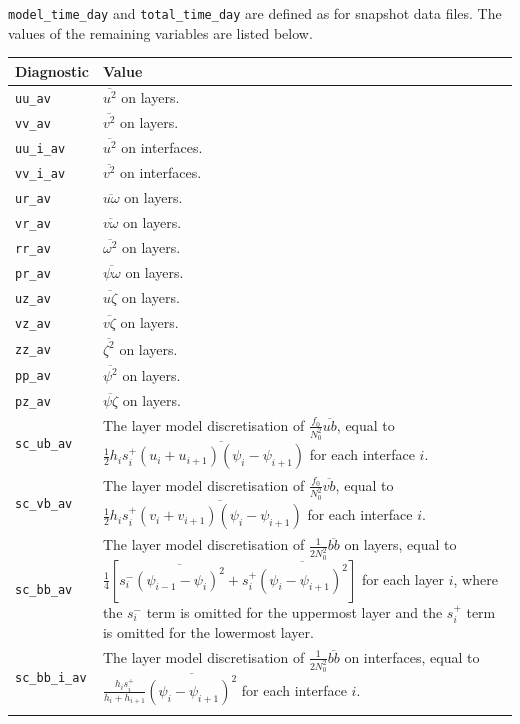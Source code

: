 \documentclass[a4paper]{book}
\begin{document}
\verb+model_time_day+ and \verb+total_time_day+ are defined as for snapshot
data files. The values of the remaining variables are listed below.
\begin{longtable}{ | p{} | p{} | }
  \hline
  Diagnostic & Value \\
  \hline
  \endhead
  \verb+uu_av+      & $\overline{u^2}$ on layers. \\
  \verb+vv_av+      & $\overline{v^2}$ on layers. \\
  \verb+uu_i_av+    & $\overline{u^2}$ on interfaces. \\
  \verb+vv_i_av+    & $\overline{v^2}$ on interfaces. \\
  \verb+ur_av+      & $\overline{u \omega}$ on layers. \\
  \verb+vr_av+      & $\overline{v \omega}$ on layers. \\
  \verb+rr_av+      & $\overline{\omega^2}$ on layers. \\
  \verb+pr_av+      & $\overline{\psi \omega}$ on layers. \\
  \verb+uz_av+      & $\overline{u \zeta}$ on layers. \\
  \verb+vz_av+      & $\overline{v \zeta}$ on layers. \\
  \verb+zz_av+      & $\overline{\zeta^2}$ on layers. \\
  \verb+pp_av+      & $\overline{\psi^2}$ on layers. \\
  \verb+pz_av+      & $\overline{\psi \zeta}$ on layers. \\
  \verb+sc_ub_av+   & The layer model discretisation of
                      $\frac{f_0}{N_0^2} \overline{u b}$, equal to
                      $\frac{1}{2} h_i s_i^+ \overline{\left( u_i + u_{i + 1} \right) \left( \psi_i - \psi_{i + 1} \right)}$
                      for each interface $i$. \\
  \verb+sc_vb_av+   & The layer model discretisation of
                      $\frac{f_0}{N_0^2} \overline{v b}$, equal to
                      $\frac{1}{2} h_i s_i^+ \overline{\left( v_i + v_{i + 1} \right) \left( \psi_i - \psi_{i + 1} \right)}$
                      for each interface $i$. \\
  \verb+sc_bb_av+   & The layer model discretisation of
                      $\frac{1}{2 N_0^2} \overline{bb}$ on layers, equal to
                      $\frac{1}{4} \left[ s_i^- \overline{\left( \psi_{i - 1} - \psi_i \right)^2} + s_i^+ \overline{\left( \psi_i - \psi_{i + 1} \right)^2} \right]$
                      for each layer $i$, where the $s_i^-$ term is omitted for
                      the uppermost layer and the $s_i^+$ term is omitted for
                      the lowermost layer. \\
  \verb+sc_bb_i_av+ & The layer model discretisation of
                      $\frac{1}{2 N_0^2} \overline{bb}$ on interfaces, equal to
                      $\frac{h_i s_i^+}{h_i + h_{i + 1}} \overline{\left( \psi_i - \psi_{i + 1} \right)^2}$
                      for each interface $i$. \\
  \hline
  \endfoot
\end{longtable}
\end{document}
